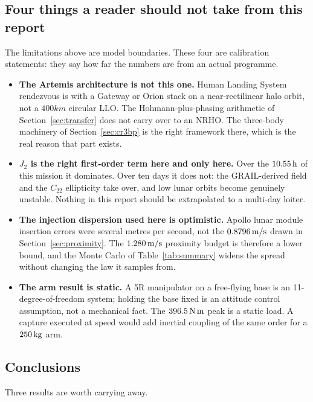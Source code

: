 \subsection{Four things a reader should not take from this report}

The limitations above are model boundaries. These four are calibration
statements: they say how far the numbers are from an actual programme.

\begin{itemize}
\item \textbf{The Artemis architecture is not this one.} Human Landing System
      rendezvous is with a Gateway or Orion stack on a near-rectilinear halo
      orbit, not a $400\unit{km}$ circular LLO. The Hohmann-plus-phasing
      arithmetic of Section~\ref{sec:transfer} does not carry over to an NRHO.
      The three-body machinery of Section~\ref{sec:cr3bp} is the right framework
      there, which is the real reason that part exists.
\item \textbf{$J_2$ is the right first-order term here and only here.} Over the
      $10.55\,\mathrm{h}$ of this mission it dominates. Over ten days it does
      not: the GRAIL-derived field and the $C_{22}$ ellipticity take over, and
      low lunar orbits become genuinely unstable. Nothing in this report should
      be extrapolated to a multi-day loiter.
\item \textbf{The injection dispersion used here is optimistic.} Apollo lunar
      module insertion errors were several metres per second, not the
      $0.8796\,\mathrm{m/s}$ drawn in Section~\ref{sec:proximity}. The
      $1.280\,\mathrm{m/s}$ proximity budget is therefore a lower bound, and the
      Monte Carlo of Table~\ref{tab:summary} widens the spread without changing
      the law it samples from.
\item \textbf{The arm result is static.} A 5R manipulator on a free-flying base
      is an 11-degree-of-freedom system; holding the base fixed is an attitude
      control assumption, not a mechanical fact. The $396.5\,\mathrm{N\,m}$ peak
      is a static load. A capture executed at speed would add inertial coupling
      of the same order for a $250\,\mathrm{kg}$ arm.
\end{itemize}

\subsection{Conclusions}

Three results are worth carrying away.

